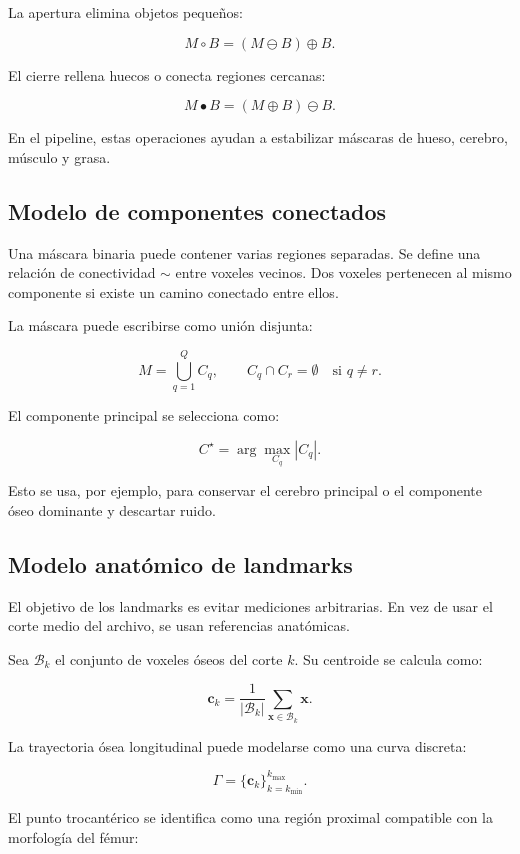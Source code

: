 \documentclass[12pt,a4paper]{article}
\begin{document}
La apertura elimina objetos pequeños:

\[
M \circ B =
(M \ominus B)\oplus B.
\]

El cierre rellena huecos o conecta regiones cercanas:

\[
M \bullet B =
(M \oplus B)\ominus B.
\]

En el pipeline, estas operaciones ayudan a estabilizar máscaras de hueso, cerebro, músculo y grasa.

\subsection{Modelo de componentes conectados}

Una máscara binaria puede contener varias regiones separadas. Se define una relación de conectividad \(\sim\) entre voxeles vecinos. Dos voxeles pertenecen al mismo componente si existe un camino conectado entre ellos.

La máscara puede escribirse como unión disjunta:

\[
M =
\bigcup_{q=1}^{Q} C_q,
\qquad
C_q \cap C_r = \emptyset
\quad
\text{si } q\neq r.
\]

El componente principal se selecciona como:

\[
C^\star =
\arg\max_{C_q}
|C_q|.
\]

Esto se usa, por ejemplo, para conservar el cerebro principal o el componente óseo dominante y descartar ruido.

\subsection{Modelo anatómico de landmarks}

El objetivo de los landmarks es evitar mediciones arbitrarias. En vez de usar el corte medio del archivo, se usan referencias anatómicas.

Sea \(\mathcal{B}_k\) el conjunto de voxeles óseos del corte \(k\). Su centroide se calcula como:

\[
\mathbf{c}_k =
\frac{1}{|\mathcal{B}_k|}
\sum_{\mathbf{x}\in \mathcal{B}_k}
\mathbf{x}.
\]

La trayectoria ósea longitudinal puede modelarse como una curva discreta:

\[
\Gamma =
\{\mathbf{c}_k\}_{k=k_{\min}}^{k_{\max}}.
\]

El punto trocantérico se identifica como una región proximal compatible con la morfología del fémur:
\end{document}
